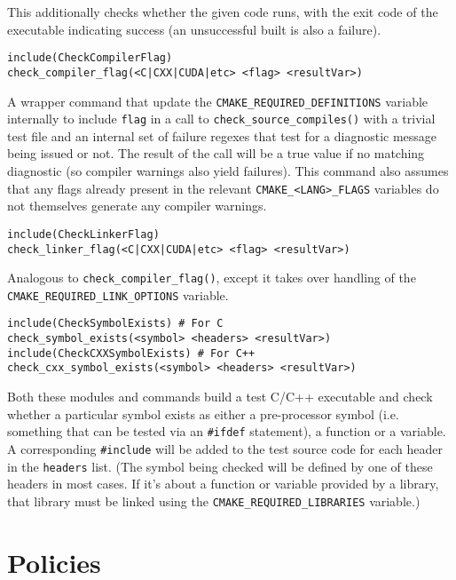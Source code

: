\documentclass[8pt, table, xcdraw]{article}%
\begin{document}
This additionally checks whether the given code runs, with the exit code of the executable indicating success (an unsuccessful built is also a failure).

\begin{lstlisting}
include(CheckCompilerFlag)
check_compiler_flag(<C|CXX|CUDA|etc> <flag> <resultVar>)
\end{lstlisting}

A wrapper command that update the \lstinline{CMAKE_REQUIRED_DEFINITIONS} variable internally to include \lstinline{flag} in a call to \lstinline{check_source_compiles()} with a trivial test file and an internal set of failure regexes that test for a diagnostic message being issued or not. The result of the call will be a true value if no matching diagnostic (so compiler warnings also yield failures). This command also assumes that any flags already present in the relevant \lstinline{CMAKE_<LANG>_FLAGS} variables do not themselves generate any compiler warnings.

\begin{lstlisting}
include(CheckLinkerFlag)
check_linker_flag(<C|CXX|CUDA|etc> <flag> <resultVar>)
\end{lstlisting}

Analogous to \lstinline{check_compiler_flag()}, except it takes over handling of the \lstinline{CMAKE_REQUIRED_LINK_OPTIONS} variable.

\begin{lstlisting}
include(CheckSymbolExists) # For C
check_symbol_exists(<symbol> <headers> <resultVar>)
include(CheckCXXSymbolExists) # For C++
check_cxx_symbol_exists(<symbol> <headers> <resultVar>)
\end{lstlisting}

Both these modules and commands build a test C/C++ executable and check whether a particular symbol exists as either a pre-processor symbol (i.e. something that can be tested via an \lstinline{#ifdef} statement), a function or a variable. A corresponding \lstinline{#include} will be added to the test source code for each header in the \lstinline{headers} list. (The symbol being checked will be defined by one of these headers in most cases. If it's about a function or variable provided by a library, that library must be linked using the \lstinline{CMAKE_REQUIRED_LIBRARIES} variable.) 

\section{Policies}
\end{document}
